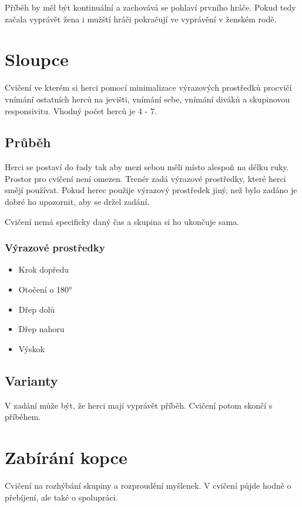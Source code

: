 \documentclass[main.tex]{subfiles}
\begin{document}
Příběh by měl být kontinuální a zachovává se pohlaví prvního hráče. Pokud tedy začala vyprávět žena i mužští hráči pokračují ve vyprávění v ženském rodě. 
 
 
\needspace{5cm} \section{Sloupce} \label{sloupce} Cvičení ve kterém si herci pomocí minimalizace výrazových prostředků procvičí vnímání ostatních herců na jevišti, vnímání sebe, vnímání diváků a skupinovou responsivitu. Vhodný počet herců je 4 - 7. 
 
\subsection{ Průběh }  
Herci se postaví do řady tak aby mezi sebou měli místo alespoň na délku ruky. Prostor pro cvičení není omezen. Trenér zadá výrazové prostředky, které herci smějí používat. Pokud herec použije výrazový prostředek jiný, než bylo zadáno je dobré ho upozornit, aby se držel zadání. 
 
Cvičení nemá specificky daný čas a skupina si ho ukončuje sama. 
 
\subsubsection{ Výrazové prostředky }  
\begin{itemize}
\item  Krok dopředu
\item  Otočení o 180°
\item  Dřep dolů
\item  Dřep nahoru
\item  Výskok
\end{itemize}
 
\subsection{ Varianty } V zadání může být, že herci mají vyprávět příběh. Cvičení potom skončí s příběhem. 
 
 
 
 
 
\needspace{5cm} \section{Zabírání kopce} \label{zabírání kopce} Cvičení na rozhýbání skupiny a rozproudění myšlenek. V cvičení půjde hodně o přebíjení, ale také o spolupráci. 
 
\end{document}
